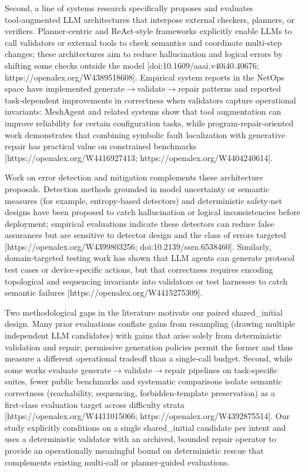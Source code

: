 \documentclass[conference]{IEEEtran}
\begin{document}
Second, a line of systems research specifically proposes and evaluates tool‑augmented LLM architectures that interpose external checkers, planners, or verifiers. Planner‑centric and ReAct‑style frameworks explicitly enable LLMs to call validators or external tools to check semantics and coordinate multi‑step changes; these architectures aim to reduce hallucination and logical errors by shifting some checks outside the model [doi:10.1609/aaai.v40i40.40676; https://openalex.org/W4389518608]. Empirical system reports in the NetOps space have implemented generate\ensuremath{\rightarrow}validate\ensuremath{\rightarrow}repair patterns and reported task‑dependent improvements in correctness when validators capture operational invariants: MeshAgent and related systems show that tool augmentation can improve reliability for certain configuration tasks, while program‑repair‑oriented work demonstrates that combining symbolic fault localization with generative repair has practical value on constrained benchmarks [https://openalex.org/W4416927413; https://openalex.org/W4404240614].

Work on error detection and mitigation complements these architecture proposals. Detection methods grounded in model uncertainty or semantic measures (for example, entropy‑based detectors) and deterministic safety‑net designs have been proposed to catch hallucination or logical inconsistencies before deployment; empirical evaluations indicate these detectors can reduce false assurances but are sensitive to detector design and the class of errors targeted [https://openalex.org/W4399803256; doi:10.2139/ssrn.6538460]. Similarly, domain‑targeted testing work has shown that LLM agents can generate protocol test cases or device‑specific actions, but that correctness requires encoding topological and sequencing invariants into validators or test harnesses to catch semantic failures [https://openalex.org/W4415275309].

Two methodological gaps in the literature motivate our paired shared\_initial design. Many prior evaluations conflate gains from resampling (drawing multiple independent LLM candidates) with gains that arise solely from deterministic validation and repair; permissive generation policies permit the former and thus measure a different operational tradeoff than a single‑call budget. Second, while some works evaluate generate\ensuremath{\rightarrow}validate\ensuremath{\rightarrow}repair pipelines on task‑specific suites, fewer public benchmarks and systematic comparisons isolate semantic correctness (reachability, sequencing, forbidden‑template preservation) as a first‑class evaluation target across difficulty strata [https://openalex.org/W4411015066; https://openalex.org/W4392875514]. Our study explicitly conditions on a single shared\_initial candidate per intent and uses a deterministic validator with an archived, bounded repair operator to provide an operationally meaningful bound on deterministic rescue that complements existing multi‑call or planner‑guided evaluations.
\end{document}

